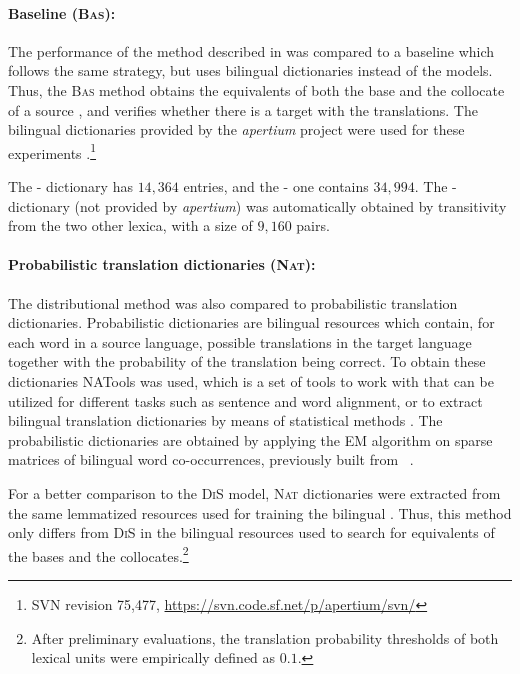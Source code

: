 \documentclass[output=paper,modfonts,nonflat]{langsci/langscibook}
\begin{document}
\paragraph*{Baseline (\textsc{Bas}):} The performance of the method described in 
was compared to a baseline which follows the same strategy, but uses bilingual
dictionaries instead of the  models. Thus, the \textsc{Bas} method obtains the
equivalents of both the base and the collocate of a source ,
and verifies whether there is a target  with the translations. The bilingual
dictionaries provided by the \emph{apertium} project were used for
these experiments \citep{apertium}.\footnote{SVN revision 75,477, \scriptsize{\url{https://svn.code.sf.net/p/apertium/svn/}}}

The - dictionary has $14,364$ entries, and the - one
contains $34,994$. The - dictionary (not provided by \emph{apertium})
was automatically obtained by transitivity from the two other lexica, with
a size of $9,160$ pairs.

\paragraph*{Probabilistic translation dictionaries (\textsc{Nat}):} The distributional method
was also compared to probabilistic translation dictionaries. Probabilistic dictionaries are
bilingual resources which contain, for each word in a source language, possible translations
in the target language together with the probability of the translation being correct.
To obtain these dictionaries NATools was used, which is a set of tools to work with 
that can be utilized for different tasks such as sentence and word alignment, or to extract bilingual
translation dictionaries by means of statistical methods \citep{natools}. The probabilistic dictionaries
are obtained by applying the EM algorithm on sparse matrices of bilingual word co-occurrences, previously
built from ~\citep{hiemstra1998}.

For a better comparison to the \textsc{DiS} model, \textsc{Nat} dictionaries were
extracted from the same lemmatized resources used for training the bilingual .
Thus, this method only differs from \textsc{DiS} in the bilingual resources used to
search for equivalents of the bases and the collocates.\footnote{After preliminary
  evaluations, the translation probability thresholds of both lexical units were empirically defined as $0.1$.}
\end{document}
